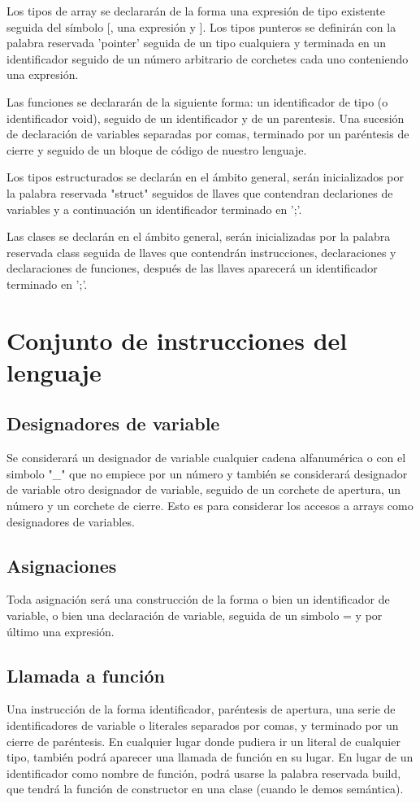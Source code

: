 \documentclass{article}
\begin{document}
\noindent Los tipos de array se declararán de la forma una expresión de tipo existente seguida del símbolo [, una expresión y ]. Los tipos punteros se definirán con la palabra reservada 'pointer' seguida de un tipo cualquiera y terminada en un identificador seguido de un número arbitrario de corchetes cada uno conteniendo una expresión.

\noindent Las funciones se declararán de la siguiente forma: un identificador de tipo (o identificador void), seguido de un identificador y de un parentesis. Una sucesión de declaración de variables separadas por comas, terminado por un paréntesis de cierre y seguido de un bloque de código de nuestro lenguaje.

\noindent Los tipos estructurados se declarán en el ámbito general, serán inicializados por la palabra reservada "struct"  seguidos de llaves que contendran declariones de variables y a continuación un identificador terminado en ';'.

\noindent Las clases se declarán en el ámbito general, serán inicializadas por la palabra reservada class seguida de llaves que contendrán instrucciones, declaraciones y declaraciones de funciones, después de las llaves aparecerá un identificador terminado en ';'.

\section{Conjunto de instrucciones del lenguaje}

\subsection{Designadores de variable}
Se considerará un designador de variable cualquier cadena alfanumérica o con el simbolo "\_" que no empiece por un número y también se considerará designador de variable otro designador de variable, seguido de un corchete de apertura, un número y un corchete de cierre. Esto es para considerar los accesos a arrays como designadores de variables.

\subsection{Asignaciones}
Toda asignación será una construcción de la forma o bien un identificador de variable, o bien una declaración de variable, seguida de un simbolo = y por último una expresión.

\subsection{Llamada a función}
Una instrucción de la forma identificador, paréntesis de apertura, una serie de identificadores de variable o literales separados por comas, y terminado por un cierre de paréntesis.
En cualquier lugar donde pudiera ir un literal de cualquier tipo, también podrá aparecer una llamada de función en su lugar. En lugar de un identificador como nombre de función, podrá usarse la palabra reservada build, que tendrá la función de constructor en una clase (cuando le demos semántica).
\end{document}
